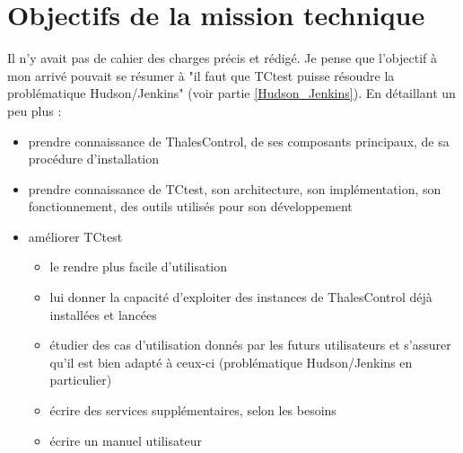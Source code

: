 \section{Objectifs de la mission technique}

Il n'y avait pas de cahier des charges précis et rédigé. Je pense que l'objectif
à mon arrivé pouvait se résumer à "il faut que TCtest puisse résoudre la 
problématique Hudson/Jenkins" (voir partie \ref{Hudson_Jenkins}). En détaillant 
un peu plus :

\begin{itemize}
	\item{prendre connaissance de ThalesControl, de ses composants principaux, 
	de sa procédure d'installation}
	\item{prendre connaissance de TCtest, son architecture, son implémentation, 
	son fonctionnement, des outils utilisés pour son développement}
	\item{améliorer TCtest
	\begin{itemize}
		\item{le rendre plus facile d'utilisation}
		\item{lui donner la capacité d'exploiter des instances de ThalesControl
		déjà installées et lancées}
		\item{étudier des cas d'utilisation donnés par les futurs utilisateurs
		et s'assurer qu'il est bien adapté à ceux-ci 
		(problématique Hudson/Jenkins en particulier)}
		\item{écrire des services supplémentaires, selon les besoins}
		\item{écrire un manuel utilisateur}
	\end{itemize}}
\end{itemize}